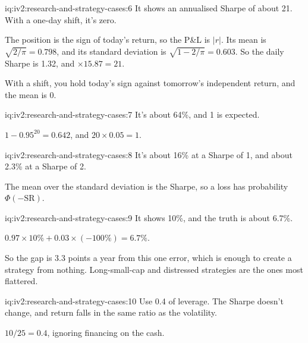\begin{solution}{iq:iv2:research-and-strategy-cases:6}
It shows an annualised Sharpe of about 21. With a one-day shift, it's zero.

The position is the sign of today's return, so the P\&L is $|r|$. Its mean is $\sqrt{2/\pi} = 0.798$, and its standard deviation is $\sqrt{1 - 2/\pi} = 0.603$. So the daily Sharpe is 1.32, and $\times 15.87 = 21$.

With a shift, you hold today's sign against tomorrow's independent return, and the mean is 0.

\end{solution}

\begin{solution}{iq:iv2:research-and-strategy-cases:7}
It's about 64\%, and 1 is expected.

$1 - 0.95^{20} = 0.642$, and $20 \times 0.05 = 1$.

\end{solution}

\begin{solution}{iq:iv2:research-and-strategy-cases:8}
It's about 16\% at a Sharpe of 1, and about 2.3\% at a Sharpe of 2.

The mean over the standard deviation is the Sharpe, so a loss has probability $\Phi(-\mathrm{SR})$.

\end{solution}

\begin{solution}{iq:iv2:research-and-strategy-cases:9}
It shows 10\%, and the truth is about 6.7\%.

$0.97 \times 10\% + 0.03 \times (-100\%) = 6.7\%$.

So the gap is 3.3 points a year from this one error, which is enough to create a strategy from nothing. Long-small-cap and distressed strategies are the ones most flattered.

\end{solution}

\begin{solution}{iq:iv2:research-and-strategy-cases:10}
Use 0.4 of leverage. The Sharpe doesn't change, and return falls in the same ratio as the volatility.

$10/25 = 0.4$, ignoring financing on the cash.

\end{solution}

